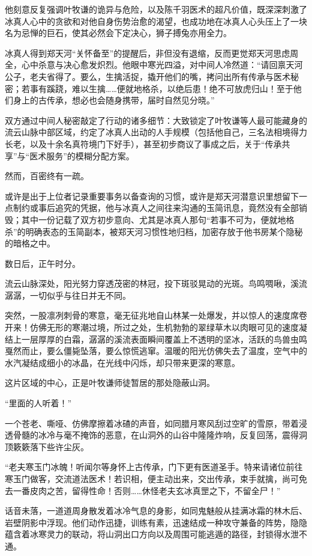 他刻意反复强调叶牧谦的诡异与危险，以及陈千羽医术的超凡价值，既深深刺激了冰真人心中的贪欲和对他自身伤势治愈的渴望，也成功地在冰真人心头压上了一块名为忌惮的巨石，使其必然会下定决心，狮子搏兔亦用全力。

冰真人得到郑天河“关怀备至”的提醒后，非但没有退缩，反而更觉郑天河思虑周全，心中杀意与决心愈发炽烈。他眼中寒光四溢，对中间人冷然道：“请回禀天河公子，老夫省得了。要么，生擒活捉，撬开他们的嘴，拷问出所有传承与医术秘密；若事有蹊跷，难以生擒……便就地格杀，以绝后患！绝不可放虎归山！至于他们身上的古传承，想必也会随身携带，届时自然见分晓。”

双方通过中间人秘密敲定了行动的诸多细节：大致锁定了叶牧谦等人最可能藏身的流云山脉中部区域，约定了冰真人出动的人手规模（包括他自己，三名法相境得力长老，以及十余名真符境门下好手），甚至初步商议了事成之后，关于“传承共享”与“医术服务”的模糊分配方案。

然而，百密终有一疏。

或许是出于上位者记录重要事务以备查询的习惯，或许是郑天河潜意识里想留下一点制约或事后追究的凭据，他与冰真人之间往来沟通的玉简讯息，竟然没有全部销毁；其中一份记载了双方初步意向、尤其是冰真人那句“若事不可为，便就地格杀”的明确表态的玉简副本，被郑天河习惯性地归档，加密存放于他书房某个隐秘的暗格之中。

\vspace{2em}

数日后，正午时分。

流云山脉深处，阳光努力穿透茂密的林冠，投下斑驳晃动的光斑。鸟鸣啁啾，溪流潺潺，一切似乎与往日并无不同。

突然，一股凛冽刺骨的寒意，毫无征兆地自山林某一处爆发，并以惊人的速度席卷开来！仿佛无形的寒潮过境，所过之处，生机勃勃的翠绿草木以肉眼可见的速度凝结上一层厚厚的白霜，潺潺的溪流表面瞬间覆盖上不透明的坚冰，活跃的鸟兽虫鸣戛然而止，要么僵毙坠落，要么惊慌逃窜。温暖的阳光仿佛失去了温度，空气中的水汽凝结成细小的冰晶，在光线中闪烁，却只带来更深的寒意。

这片区域的中心，正是叶牧谦师徒暂居的那处隐蔽山洞。

“里面的人听着！”

一个苍老、嘶哑、仿佛摩擦着冰碴的声音，如同腊月寒风刮过空旷的雪原，带着浸透骨髓的冰冷与毫不掩饰的恶意，在山洞外的山谷中隆隆炸响，反复回荡，震得洞顶簌簌落下些许尘灰。

“老夫寒玉门冰魄！听闻尔等身怀上古传承，门下更有医道圣手。特来请诸位前往寒玉门做客，交流道法医术！若识相，便主动出来，交出传承，束手就擒，尚可免去一番皮肉之苦，留得性命！否则……休怪老夫玄冰真罡之下，不留全尸！”

话音未落，一道道周身散发着冰冷气息的身影，如同鬼魅般从挂满冰霜的林木后、岩壁阴影中浮现。他们动作迅捷，训练有素，迅速结成一种攻守兼备的阵势，隐隐蕴含着冰寒灵力的联动，将山洞出口方向以及周围可能逃遁的路径，封锁得水泄不通。

